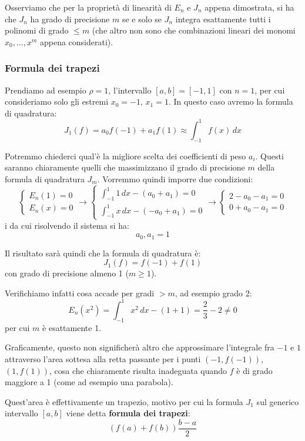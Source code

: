 \documentclass[a4paper,11pt]{article}
\begin{document}
Osserviamo che per la proprietà di linearità di $E_n$ e $J_n$ appena dimostrata, si ha che $J_n$ ha grado di precisione $m$ se e solo se $J_n$ integra esattamente tutti i polinomi di grado $\leq m$ (che altro non sono che combinazioni lineari dei monomi $x_0, ..., x^{m}$ appena considerati).

\subsubsection{Formula dei trapezi}

Prendiamo ad esempio $\rho = 1$, l'intervallo $[a, b] = [-1, 1]$ con $n = 1$, per cui consideriamo solo gli estremi $x_0 = -1$, $x_1 = 1$.
In questo caso avremo la formula di quadratura:
$$
J_1 (f) = a_0 f(-1) + a_1 f(1) \approx \int_{-1}^{1} f(x) \, dx
$$

Potremmo chiederci qual'è la migliore scelta dei coefficienti di peso $a_i$.
Questi saranno chiaramente quelli che massimizzano il grado di precisione $m$ della formula di quadratura $J_m$.
Vorremmo quindi imporre due condizioni:
$$
	\begin{cases}
		E_n(1) = 0 \\
		E_n(x) = 0
	\end{cases}
	\rightarrow
	\begin{cases}
		\int_{-1}^1 1 \, dx - (a_0 + a_1) = 0 \\
		\int_{-1}^1 x \, dx - (-a_0 + a_1) = 0
	\end{cases}
	\rightarrow
	\begin{cases}
		2 - a_0 - a_1 = 0 \\
		0 + a_0 - a_1 = 0
	\end{cases}
$$i
da cui risolvendo il sistema si ha:
$$a_0, a_1 = 1$$

Il risultato sarà quindi che la formula di quadratura è:
$$
J_1 (f) = f(-1) + f(1)
$$
con grado di precisione almeno 1 ($m \geq 1$).

Verifichiamo infatti cosa accade per gradi $> m$, ad esempio grado 2:
$$
E_n(x^2) = \int_{-1}^1 x^2 \, dx - (1 + 1) = \frac{2}{3} - 2 \neq 0
$$
per cui $m$ è esattamente 1.

Graficamente, questo non significherà altro che approssimare l'integrale fra $-1$ e $1$ attraverso l'area sottesa alla retta passante per i punti $(-1, f(-1))$, $(1, f(1))$, cosa che chiaramente risulta inadeguata quando $f$ è di grado maggiore a 1 (come ad esempio una parabola).

Quest'area è effettivamente un trapezio, motivo per cui la formula $J_1$ sul generico intervallo $[a, b]$ viene detta \textbf{formula dei trapezi}:
$$
\left(f(a) + f(b)\right) \frac{b - a}{2}
$$
\end{document}
